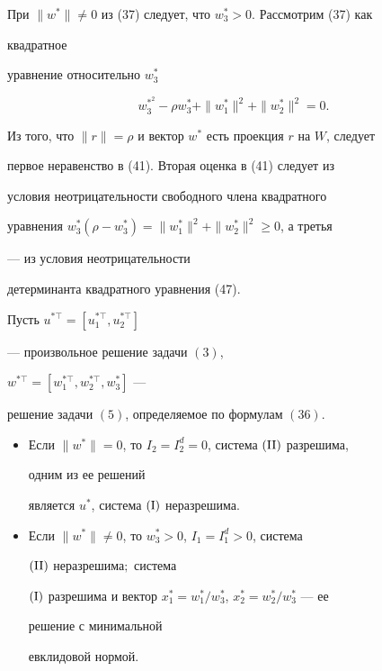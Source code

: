 \begin{pf}
При $\|w^*\|\ne0$ из (37) следует, что $w^*_3>0$. Рассмотрим (37) как 


квадратное


уравнение относительно $w^*_3$


\begin{equation}


w^{*^2}_3-\rho w^*_3+\|w^*_1\|^2+\|w^*_2\|^2=0.


\end{equation}





Из того, что $\|r\|=\rho$ и вектор $w^*$ есть проекция $r$ на $W$, следует


первое неравенство в (41). Вторая оценка в (41) следует из


условия неотрицательности свободного члена квадратного


уравнения $w^*_3(\rho-w^*_3)=\|w^*_1\|^2+\|w^*_2\|^2\ge0$, а третья 


--- из условия неотрицательности


детерминанта квадратного уравнения (47).


\end{pf}





\begin{thm}


Пусть $u^{*\top}=[u^{*\top}_1,u^{*\top}_2]$


--- произвольное решение задачи $(3)$,


$w^{*\top}=[w^{*\top}_1,w^{*\top}_2,w^*_3]$ ---


решение задачи $(5)$, определяемое по формулам $(36)$.


\begin{itemize}


\item[1.] Если $\|w^*\|=0$, то $I_2=I^d_2=0$, система $(\mathrm{II})$ разрешима, 


одним из ее решений


является $u^*$, система $(\mathrm I)$ неразрешима.


\item[2.] Если $\|w^*\|\ne0$, то $w^*_3>0$, $I_1=I^d_1>0$, система 


$(\mathrm{II})$ неразрешима$;$ система


$(\mathrm I)$ разрешима и вектор $x^*_1=w^*_1/w^*_3$, $x^*_2=w^*_2/w^*_3$ --- ее 


решение с минимальной


евклидовой нормой.


\end{itemize}


\end{thm}





